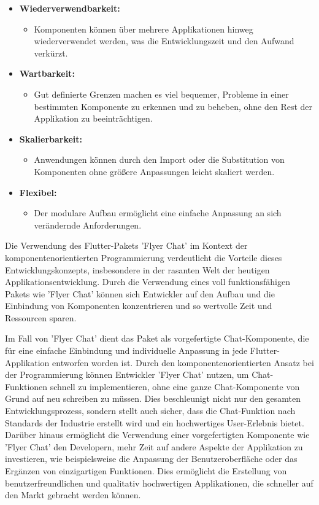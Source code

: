 \begin{itemize}
  \item \textbf{Wiederverwendbarkeit:}
        \begin{itemize}
          \item {Komponenten können über mehrere Applikationen hinweg wiederverwendet werden, was die Entwicklungszeit und den Aufwand verkürzt.}
        \end{itemize}
  \item \textbf{Wartbarkeit:}
        \begin{itemize}
          \item {Gut definierte Grenzen machen es viel bequemer, Probleme in einer bestimmten Komponente zu erkennen und zu beheben, ohne den Rest der Applikation zu beeinträchtigen.}
        \end{itemize}
  \item \textbf{Skalierbarkeit:}
        \begin{itemize}
          \item {Anwendungen können durch den Import oder die Substitution von Komponenten ohne größere Anpassungen leicht skaliert werden.}
        \end{itemize}
  \item \textbf{Flexibel:}
        \begin{itemize}
          \item {Der modulare Aufbau ermöglicht eine einfache Anpassung an sich verändernde Anforderungen.}
        \end{itemize}
\end{itemize}

Die Verwendung des Flutter-Pakets 'Flyer Chat' im Kontext der komponentenorientierten Programmierung verdeutlicht die Vorteile dieses Entwicklungskonzepts, insbesondere in der rasanten Welt der heutigen Applikationsentwicklung. Durch die Verwendung eines voll funktionsfähigen Pakets wie 'Flyer Chat' können sich Entwickler auf den Aufbau und die Einbindung von Komponenten konzentrieren und so wertvolle Zeit und Ressourcen sparen.

Im Fall von 'Flyer Chat' dient das Paket als vorgefertigte Chat-Komponente, die für eine einfache Einbindung und individuelle Anpassung in jede Flutter-Applikation entworfen worden ist. Durch den komponentenorientierten Ansatz bei der Programmierung können Entwickler 'Flyer Chat' nutzen, um Chat-Funktionen schnell zu implementieren, ohne eine ganze Chat-Komponente von Grund auf neu schreiben zu müssen. Dies beschleunigt nicht nur den gesamten Entwicklungsprozess, sondern stellt auch sicher, dass die Chat-Funktion nach Standards der Industrie erstellt wird und ein hochwertiges User-Erlebnis bietet.
Darüber hinaus ermöglicht die Verwendung einer vorgefertigten Komponente wie 'Flyer Chat' den Developern, mehr Zeit auf andere Aspekte der Applikation zu investieren, wie beispielsweise die Anpassung der Benutzeroberfläche oder das Ergänzen von einzigartigen Funktionen. Dies ermöglicht die Erstellung von benutzerfreundlichen und qualitativ hochwertigen Applikationen, die schneller auf den Markt gebracht werden können.

